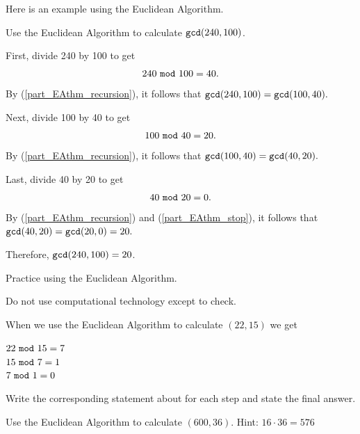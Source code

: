 Here is an example using the Euclidean Algorithm.

\begin{exam}
\label{exam_Euclidean_alg}
    Use the Euclidean Algorithm to calculate $\texttt{gcd}(240,100)$.
        \begin{soln}
            First, divide 240 by 100 to get $$240 ~\texttt{mod}~ 100 =40.$$
            By  (\ref{part_EAthm_recursion}), it follows that $\texttt{gcd}(240,100)=\texttt{gcd}(100,40).$

            Next, divide 100 by 40 to get $$100 ~\texttt{mod}~ 40 =20.$$
            By  (\ref{part_EAthm_recursion}), it follows that $\texttt{gcd}(100,40)=\texttt{gcd}(40,20).$

            Last, divide 40 by 20 to get $$40 ~\texttt{mod}~ 20 =0.$$
            By  (\ref{part_EAthm_recursion}) and (\ref{part_EAthm_stop}), it follows that $\texttt{gcd}(40,20)=\texttt{gcd}(20,0)=20.$ 

            Therefore, $\texttt{gcd}(240,100)=20$.
        \end{soln}
\end{exam}

Practice using the Euclidean Algorithm.

\begin{act}
\label{act_ea}
    Do not use computational technology except to check.
        \begin{actpart}
            \item When we use the Euclidean Algorithm to calculate $(22,15)$ we get

            \begin{center}
                $22 ~\texttt{mod}~ 15 = 7$\\
                $15 ~\texttt{mod}~ 7 = 1$ \\ 
                $7 ~\texttt{mod}~ 1 = 0$ 
            \end{center}
            Write the corresponding statement about  for each step and state the final answer.    
            
            \item Use the Euclidean Algorithm to calculate $(600,36)$.  Hint: $16 \cdot 36 = 576$  %
            
        \end{actpart}  
\end{act}

